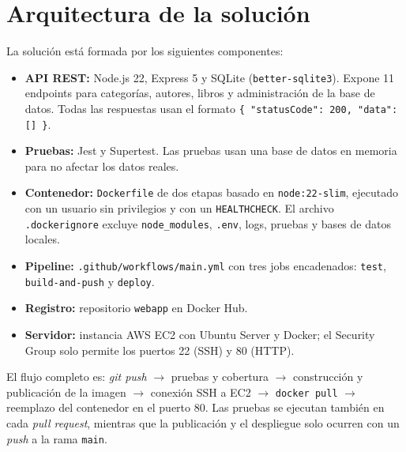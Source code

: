 \documentclass[12pt,letterpaper]{article}
\begin{document}
\section{Arquitectura de la solución}

La solución está formada por los siguientes componentes:

\begin{itemize}
  \item \textbf{API REST:} Node.js 22, Express 5 y SQLite (\texttt{better-sqlite3}). Expone 11 endpoints para categorías, autores, libros y administración de la base de datos. Todas las respuestas usan el formato \texttt{\{ "statusCode": 200, "data": [] \}}.
  \item \textbf{Pruebas:} Jest y Supertest. Las pruebas usan una base de datos en memoria para no afectar los datos reales.
  \item \textbf{Contenedor:} \texttt{Dockerfile} de dos etapas basado en \texttt{node:22-slim}, ejecutado con un usuario sin privilegios y con un \texttt{HEALTHCHECK}. El archivo \texttt{.dockerignore} excluye \texttt{node\_modules}, \texttt{.env}, logs, pruebas y bases de datos locales.
  \item \textbf{Pipeline:} \texttt{.github/workflows/main.yml} con tres jobs encadenados: \texttt{test}, \texttt{build-and-push} y \texttt{deploy}.
  \item \textbf{Registro:} repositorio \texttt{webapp} en Docker Hub.
  \item \textbf{Servidor:} instancia AWS EC2 con Ubuntu Server y Docker; el Security Group solo permite los puertos 22 (SSH) y 80 (HTTP).
\end{itemize}

El flujo completo es: \textit{git push} $\rightarrow$ pruebas y cobertura $\rightarrow$ construcción y publicación de la imagen $\rightarrow$ conexión SSH a EC2 $\rightarrow$ \texttt{docker pull} $\rightarrow$ reemplazo del contenedor en el puerto 80. Las pruebas se ejecutan también en cada \textit{pull request}, mientras que la publicación y el despliegue solo ocurren con un \textit{push} a la rama \texttt{main}.
\end{document}
